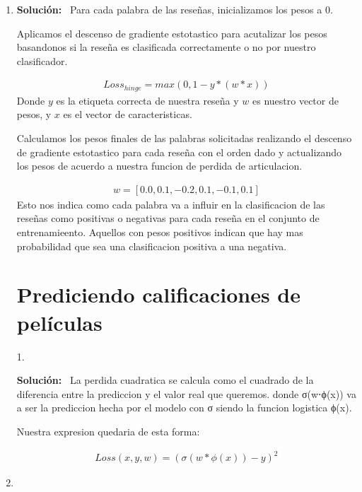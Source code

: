 \documentclass[11pt,letterpaper]{article}
\newenvironment{solution}{%
  \noindent\begin{shaded}
  \textbf{Solución:}\ }{
  \end{shaded}%
}
\begin{document}
\begin{enumerate}
\item%
  
  \begin{solution}
    Para cada palabra de las reseñas, inicializamos los pesos a 0.

Aplicamos el descenso de gradiente estotastico para acutalizar los pesos basandonos si la reseña es clasificada correctamente o no por nuestro clasificador.

  \[
  \begin{aligned}
    Loss_{hinge} = max(0,1-y * (w * x))
  \end{aligned}
  \]
Donde \(y\) es la etiqueta correcta de nuestra reseña y \(w\) es nuestro vector de pesos, y \( x\) es el vector de caracteristicas.

Calculamos los pesos finales de las palabras solicitadas realizando el descenso de gradiente estotastico para cada reseña con el orden dado y actualizando los pesos de acuerdo a nuestra funcion de perdida de articulacion.

  \[
  \begin{aligned}
    w = [0.0, 0.1, -0.2, 0.1, -0.1, 0.1]
  \end{aligned}
  \]
Esto nos indica como cada palabra va a influir en la clasificacion de las reseñas como positivas o negativas para cada reseña en el conjunto de entrenamieento. Aquellos con pesos positivos indican que hay mas probabilidad que sea una clasificacion positiva a una negativa.
  \end{solution}

\section*{Prediciendo calificaciones de películas  }

    1.
  \begin{solution}
    La perdida cuadratica se calcula como el cuadrado de la diferencia entre la prediccion y el valor real que queremos. donde σ(w⋅ϕ(x)) va a ser la prediccion hecha por el modelo con σ siendo la funcion logistica ϕ(x).

Nuestra expresion quedaria de esta forma:

  \[
  \begin{aligned}
    Loss(x,y,w) = (\sigma(w * \phi(x)) - y)^2
  \end{aligned}
  \]
  \end{solution} 
\item%
  

\end{enumerate}
\end{document}
